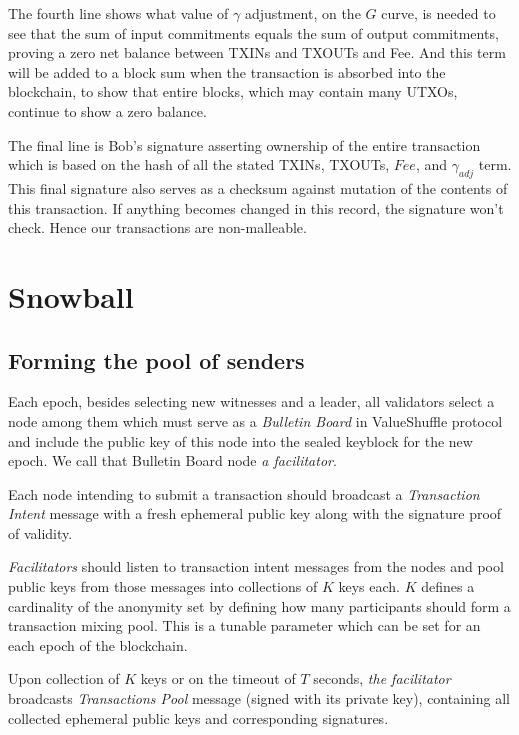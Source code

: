 \documentclass[8pt,fleqn,openany]{book}
\begin{document}
{		The fourth line shows what value of $\gamma$ adjustment, on the $G$ curve, is needed to see that the sum of input commitments equals the sum of output commitments, proving a zero net balance between TXINs and TXOUTs and Fee. And this term will be added to a block sum when the transaction is absorbed into the blockchain, to show that entire blocks, which may contain many UTXOs, continue to show a zero balance.
		
		The final line is Bob’s signature asserting ownership of the entire transaction which is based on the hash of all the stated TXINs, TXOUTs, $Fee$, and $\gamma_{adj}$ term. This final signature also serves as a checksum against mutation of the contents of this transaction. If anything becomes changed in this record, the signature won’t check. Hence our transactions are non-malleable.
		
		\chapter{Snowball}\label{app:snowball}
		
		\section{Forming the pool of senders}
		Each epoch, besides selecting new witnesses and a leader, all validators select a node among them which must serve as a \textit{Bulletin Board} in ValueShuffle protocol and include the public key of this node into the sealed keyblock for the new epoch. We call that Bulletin Board node \textit{a facilitator}.
		
		Each node intending to submit a transaction should broadcast a \textit{Transaction Intent} message with a fresh ephemeral public key along with the signature proof of validity.
		
		\textit{Facilitators} should listen to transaction intent messages from the nodes and pool public keys from those messages into collections of $K$ keys each. $K$ defines a cardinality of the anonymity set by defining how many participants should form a transaction mixing pool. This is a tunable parameter which can be set for an each epoch of the blockchain. 
		
		Upon collection of $K$ keys or on the timeout of $T$ seconds, \textit{the facilitator} broadcasts \textit{Transactions Pool} message (signed with its private key), containing all collected ephemeral public keys and corresponding signatures.
		
}
\end{document}
